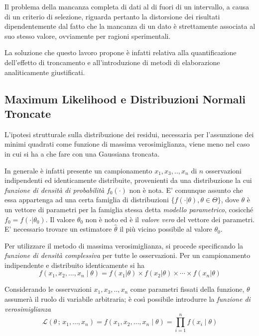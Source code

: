 \documentclass[12pt,openright,twoside,a4paper]{book}
\begin{document}
Il problema della mancanza completa di dati al di fuori di un intervallo, a causa di un criterio di selezione, riguarda pertanto la distorsione dei risultati dipendentemente dal fatto che la mancanza di un dato è strettamente associata al suo stesso valore, ovviamente per ragioni sperimentali.

La soluzione che questo lavoro propone è infatti relativa alla quantificazione dell'effetto di troncamento e all'introduzione di metodi di elaborazione analiticamente giustificati.

\subsection{Maximum Likelihood e Distribuzioni Normali Troncate}
L'ipotesi strutturale sulla distribuzione dei residui, necessaria per l'assunzione dei minimi quadrati come funzione di massima verosimiglianza, viene meno nel caso in cui si ha a che fare con una Gaussiana troncata.

In generale è infatti presente un campionamento $x_1,x_3,..,x_n$ di $n$ osservazioni indipendenti ed identicamente distribuite, provenienti da una distribuzione la cui \textit{funzione di densità di probabilità }  $f_0(\cdot)$ non è nota.
E' comunque assunto che essa appartenga ad una certa famiglia di distribuzioni $ \{f(\cdot |\theta),\theta\in\Theta\} $, dove $\theta$ è un vettore di parametri per la famiglia stessa detta \textit{modello parametrico}, cosicché $f_0=f(\cdot |\theta_0)$.
Il valore $\theta_0$ non è noto ed è il \textit{valore vero} del vettore dei parametri.
E' necessario trovare un estimatore $\hat{\theta}$ il più vicino possibile al valore $\theta_0$.

Per utilizzare il metodo di massima verosimiglianza, si procede specificando la \textit{funzione di densità complessiva} per tutte le osservazioni.
Per un campionamento indipendente e distribuito identicamente si ha
\begin{equation}
f(x_1,x_2,\ldots,x_n\mid\theta) = f(x_1|\theta)\times f(x_2|\theta) \times \cdots \times  f(x_n|\theta)
\end{equation}

Considerando le osservazioni $x_1,x_3,..,x_n$ come parametri fissati della funzione, $\theta$ assumerà il ruolo di variabile arbitraria; è così possibile introdurre la \textit{funzione di verosimiglianza}
\begin{equation}
\mathcal{L}(\theta\,;\,x_1,\ldots,x_n) = f(x_1,x_2,\ldots,x_n\mid\theta) = \prod_{i=1}^n f(x_i\mid\theta)
\end{equation}
\end{document}
